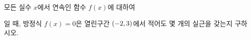 모든 실수 $x$에서 연속인 함수 $f(x)$에 대하여 \par\smallskip{}\par\smallskip\noindent 일 때, 방정식 $f(x)=0$은 열린구간 $(-2{,}\mkern3mu\mathopen{}3)$에서 적어도 몇 개의 실근을 갖는지 구하시오.
